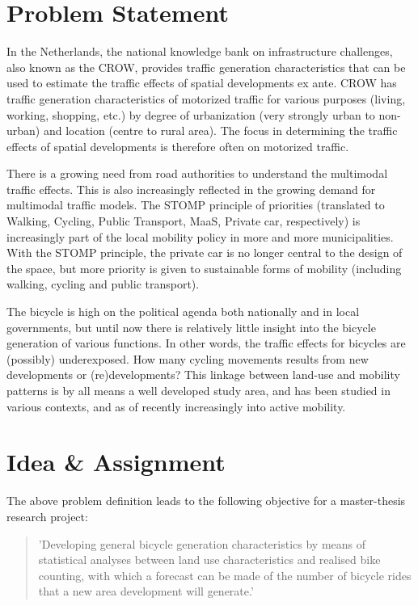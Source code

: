 \section{Problem Statement}
In the Netherlands, the national knowledge bank on infrastructure challenges, also known as the CROW, provides traffic generation characteristics that can be used to estimate the traffic effects of spatial developments ex ante. CROW has traffic generation characteristics of motorized traffic for various purposes (living, working, shopping, etc.) by degree of urbanization (very strongly urban to non-urban) and location (centre to rural area). The focus in determining the traffic effects of spatial developments is therefore often on motorized traffic. 

There is a growing need from road authorities to understand the multimodal traffic effects. This is also increasingly reflected in the growing demand for multimodal traffic models. The STOMP principle of priorities (translated to Walking, Cycling, Public Transport, MaaS, Private car, respectively) is increasingly part of the local mobility policy in more and more municipalities. With the STOMP principle, the private car is no longer central to the design of the space, but more priority is given to sustainable forms of mobility (including walking, cycling and public transport). 

The bicycle is high on the political agenda both nationally and in local governments, but until now there is relatively little insight into the bicycle generation of various functions. In other words, the traffic effects for bicycles are (possibly) underexposed. How many cycling movements results from new developments or (re)developments? This linkage between land-use and mobility patterns is by all means a well developed study area, and has been studied in various contexts, and as of recently increasingly into active mobility.

\section{Idea \& Assignment}
The above problem definition leads to the following objective for a master-thesis research project:

\begin{quote}
    'Developing general bicycle generation characteristics by means of statistical analyses between land use characteristics and realised bike counting, with which a forecast can be made of the number of bicycle rides that a new area development will generate.'
\end{quote}
 
